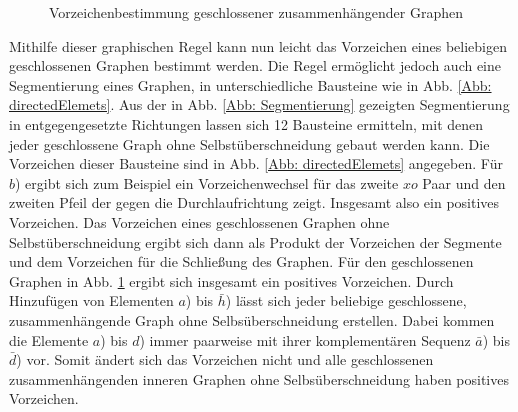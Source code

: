 \begin{figure}[h!]
    \centering
    \captionsetup[subfigure]{labelformat=empty}
    \begin{subfigure}[c]{0.4\textwidth}
        \centering
        
    \end{subfigure}
    \hspace{0.1\textwidth}
    \begin{subfigure}[c]{0.4\textwidth}
    \end{subfigure}
    \caption{Vorzeichenbestimmung geschlossener zusammenhängender Graphen } \label{Abb: VorzeichenBestimmung}
\end{figure}
\FloatBarrier
\noindent Mithilfe dieser graphischen Regel kann nun leicht das Vorzeichen eines beliebigen geschlossenen Graphen bestimmt werden. Die Regel ermöglicht jedoch auch eine Segmentierung eines Graphen, in unterschiedliche Bausteine wie in Abb. \ref{Abb: directedElemets}. Aus der in Abb. \ref{Abb: Segmentierung} gezeigten Segmentierung in entgegengesetzte Richtungen lassen sich 12 Bausteine ermitteln, mit denen jeder geschlossene Graph ohne Selbstüberschneidung gebaut werden kann. Die Vorzeichen dieser Bausteine sind in Abb. \ref{Abb: directedElemets} angegeben. Für $b$) ergibt sich zum Beispiel ein Vorzeichenwechsel für das zweite $xo$ Paar und den zweiten Pfeil der gegen die Durchlaufrichtung zeigt. Insgesamt also ein positives Vorzeichen. Das Vorzeichen eines geschlossenen Graphen ohne Selbstüberschneidung ergibt sich dann als Produkt der Vorzeichen der Segmente und dem Vorzeichen für die Schließung des Graphen. Für den geschlossenen Graphen in Abb. \ref{Abb: VorzeichenBestimmung} ergibt sich insgesamt ein positives Vorzeichen. Durch Hinzufügen von Elementen $a$) bis $\bar h$) lässt sich jeder beliebige geschlossene, zusammenhängende Graph ohne Selbsüberschneidung erstellen. Dabei kommen die Elemente $a$) bis $d$) immer paarweise mit ihrer komplementären Sequenz $\bar a$) bis $\bar d$) vor. Somit ändert sich das Vorzeichen nicht und alle geschlossenen zusammenhängenden inneren Graphen ohne Selbsüberschneidung haben positives Vorzeichen. 

